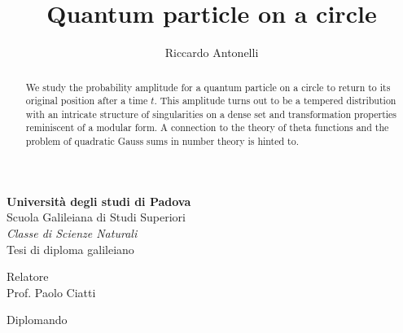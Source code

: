 \documentclass{article}
\title{Quantum particle on a circle}
\author{Riccardo Antonelli}
\begin{document}
\makeatletter
\begin{center} \Large
    \vfill
    {\LARGE \textbf{Universit\`a degli studi di Padova}}\\
    \vspace{20pt}
    {\LARGE Scuola Galileiana di Studi Superiori}\\
    \vspace{20pt}
    \emph{Classe di Scienze Naturali}\\ 
    \vspace{40pt}
    Tesi di diploma galileiano\\

    \vspace{120pt}

    {\Huge \bfseries \@title }
    \vfill

\end{center}

\vspace{100pt}

\begin{multicols}{2} \Large
    \begin{flushleft}
    Relatore\\
    Prof. Paolo Ciatti
\end{flushleft}

    \columnbreak

    \begin{flushright}
    Diplomando\\
    \@author
\end{flushright}

\end{multicols}

\vspace{30pt}


\newpage

\maketitle

\begin{abstract}
    We study the probability amplitude for a quantum particle on a circle to return to its original position after a time $t$. This amplitude turns out to be a tempered distribution with an intricate structure of singularities on a dense set and transformation properties reminiscent of a modular form. A connection to the theory of theta functions and the problem of quadratic Gauss sums in number theory is hinted to.
\end{abstract}
\end{document}

